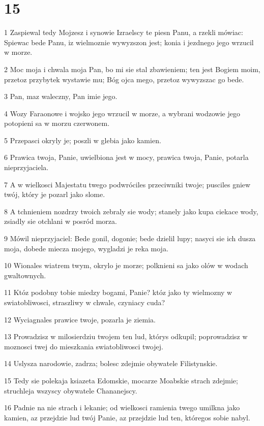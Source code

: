 \chapter{15}

\par 1 Zaspiewal tedy Mojzesz i synowie Izraelscy te piesn Panu, a rzekli mówiac: Spiewac bede Panu, iz wielmoznie wywyzszon jest; konia i jezdnego jego wrzucil w morze.
\par 2 Moc moja i chwala moja Pan, bo mi sie stal zbawieniem; ten jest Bogiem moim, przetoz przybytek wystawie mu; Bóg ojca mego, przetoz wywyzszac go bede.
\par 3 Pan, maz waleczny, Pan imie jego.
\par 4 Wozy Faraonowe i wojsko jego wrzucil w morze, a wybrani wodzowie jego potopieni sa w morzu czerwonem.
\par 5 Przepasci okryly je; poszli w glebia jako kamien.
\par 6 Prawica twoja, Panie, uwielbiona jest w mocy, prawica twoja, Panie, potarla nieprzyjaciela.
\par 7 A w wielkosci Majestatu twego podwróciles przeciwniki twoje; pusciles gniew twój, który je pozarl jako slome.
\par 8 A tchnieniem nozdrzy twoich zebraly sie wody; stanely jako kupa ciekace wody, zsiadly sie otchlani w posród morza.
\par 9 Mówil nieprzyjaciel: Bede gonil, dogonie; bede dzielil lupy; nasyci sie ich dusza moja, dobede miecza mojego, wygladzi je reka moja.
\par 10 Wionales wiatrem twym, okrylo je morze; polknieni sa jako olów w wodach gwaltownych.
\par 11 Któz podobny tobie miedzy bogami, Panie? któz jako ty wielmozny w swiatobliwosci, straszliwy w chwale, czyniacy cuda?
\par 12 Wyciagnales prawice twoje, pozarla je ziemia.
\par 13 Prowadzisz w milosierdziu twojem ten lud, którys odkupil; poprowadzisz w moznosci twej do mieszkania swiatobliwosci twojej.
\par 14 Uslysza narodowie, zadrza; bolesc zdejmie obywatele Filistynskie.
\par 15 Tedy sie polekaja ksiazeta Edomskie, mocarze Moabskie strach zdejmie; struchleja wszyscy obywatele Chananejscy.
\par 16 Padnie na nie strach i lekanie; od wielkosci ramienia twego umilkna jako kamien, az przejdzie lud twój Panie, az przejdzie lud ten, któregos sobie nabyl.
